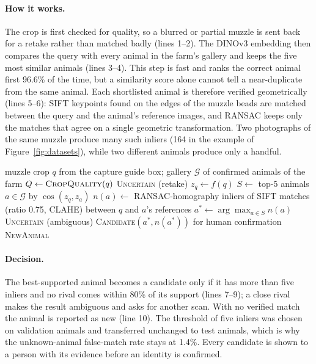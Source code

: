\documentclass[11pt,letterpaper]{article}
\begin{document}
\paragraph{How it works.} The crop is first checked for quality, so a blurred or partial muzzle is sent back for a retake rather than matched badly (lines 1--2). The DINOv3 embedding then compares the query with every animal in the farm's gallery and keeps the five most similar animals (lines 3--4). This step is fast and ranks the correct animal first 96.6\% of the time, but a similarity score alone cannot tell a near-duplicate from the same animal. Each shortlisted animal is therefore verified geometrically (lines 5--6): SIFT keypoints found on the edges of the muzzle beads are matched between the query and the animal's reference images, and RANSAC keeps only the matches that agree on a single geometric transformation. Two photographs of the same muzzle produce many such inliers (164 in the example of Figure~\ref{fig:datasets}), while two different animals produce only a handful.

\begin{algorithm}[H]
\caption{Open-set muzzle identification (enrollment and claim-time check)}
\label{alg:muzzle}
\begin{algorithmic}[1]
\Require muzzle crop $q$ from the capture guide box; gallery $\mathcal{G}$ of confirmed animals of the farm
\State $Q \gets \textsc{CropQuality}(q)$
 \Return \textsc{Uncertain} (retake) \EndIf
\State $z_q \gets f(q)$ 
\State $S \gets$ top-5 animals $a \in \mathcal{G}$ by $\cos(z_q, z_a)$
  \State $n(a) \gets$ RANSAC-homography inliers of SIFT matches (ratio 0.75, CLAHE) between $q$ and $a$'s references
\EndFor
\State $a^{*} \gets \arg\max_{a \in S} n(a)$
 \Return \textsc{Uncertain} (ambiguous) \EndIf
{} \Return \textsc{Candidate}$(a^{*}, n(a^{*}))$ for human confirmation \EndIf
\State \Return \textsc{NewAnimal}
\end{algorithmic}
\end{algorithm}

\paragraph{Decision.} The best-supported animal becomes a candidate only if it has more than five inliers and no rival comes within 80\% of its support (lines 7--9); a close rival makes the result ambiguous and asks for another scan. With no verified match the animal is reported as new (line 10). The threshold of five inliers was chosen on validation animals and transferred unchanged to test animals, which is why the unknown-animal false-match rate stays at 1.4\%. Every candidate is shown to a person with its evidence before an identity is confirmed.
\end{document}
